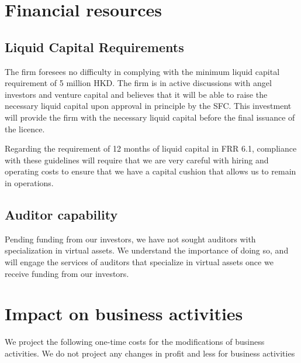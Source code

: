 \section{Financial resources}
\subsection{Liquid Capital Requirements}

The firm foresees no difficulty in complying with the minimum liquid
capital requirement of 5 million HKD.  The firm is in active
discussions with angel investors and venture capital and believes that
it will be able to raise the necessary liquid capital upon approval in
principle by the SFC. This investment will provide the firm with
the necessary liquid capital before the final issuance of the licence.

Regarding the requirement of 12 months of liquid capital in FRR
6.1, compliance with these guidelines will require that we are very
careful with hiring and operating costs to ensure that we
have a capital cushion that allows us to remain in operations.


\subsection{Auditor capability}
Pending funding from our investors, we have not sought auditors with
specialization in virtual assets.  We understand the importance of
doing so, and will engage the services of auditors that specialize in
virtual assets once we receive funding from our investors.

\section{Impact on business activities}

We project the following one-time costs for the modifications of
business activities.  We do not project any changes in profit and less
for business activities

